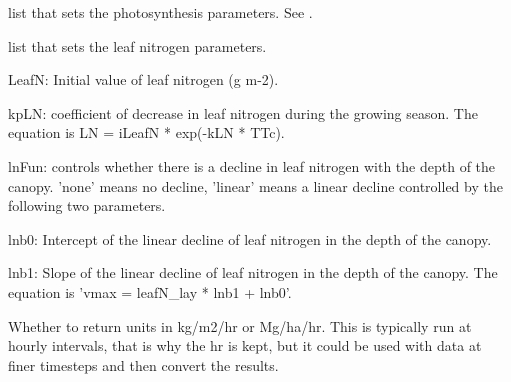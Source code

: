 \documentclass[letterpaper]{book}
\begin{document}
\begin{Arguments}
\begin{ldescription}
\item[\code{photoControl}] list that sets the photosynthesis
parameters. See .

\item[\code{lnControl}] list that sets the leaf nitrogen
parameters.

LeafN: Initial value of leaf nitrogen (g m-2).

kpLN: coefficient of decrease in leaf nitrogen during the
growing season. The equation is LN = iLeafN * exp(-kLN *
TTc).

lnFun: controls whether there is a decline in leaf
nitrogen with the depth of the canopy. 'none' means no
decline, 'linear' means a linear decline controlled by
the following two parameters.

lnb0: Intercept of the linear decline of leaf nitrogen in
the depth of the canopy.

lnb1: Slope of the linear decline of leaf nitrogen in the
depth of the canopy. The equation is 'vmax = leafN\_lay *
lnb1 + lnb0'.

\item[\code{units}] Whether to return units in kg/m2/hr or
Mg/ha/hr. This is typically run at hourly intervals, that
is why the hr is kept, but it could be used with data at
finer timesteps and then convert the results.
\end{ldescription}
\end{Arguments}
%
\end{document}
